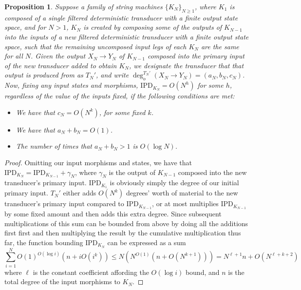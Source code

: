 \documentclass{article}
\newtheorem{proposition}[theorem]{Proposition}
\theoremstyle{definition}
\theoremstyle{remark}
\begin{document}
\begin{proposition}
    \label{prop:linearruntimeintransducers}
    Suppose a family of string machines $\{K_N\}_{N \geq 1}$, where
    $K_1$ is composed of a single filtered
    deterministic transducer with a finite
    output state space, and for $N>1$,
    $K_N$ is created by composing some of the outputs of $K_{N-1}$
    into the inputs of a new filtered deterministic transducer
    with a finite output state space,
    such that the
    remaining uncomposed input legs of each $K_N$ are the same for
    all $N$. Given the output
    $X_N\to Y_N$ of $K_{N-1}$ composed into the primary
    input of the new transducer added to obtain $K_N$, we designate
    the transducer that that output is produced from as $T_N'$, and
    write $\deg_o^{T_N'}(X_N\to Y_N) = (a_N,b_N,c_N)$.
    Now, fixing any input states and morphisms,
    $\mathrm{IPD}_{K_N} = O(N^h)$ for some $h$, regardless
    of the value of the inputs fixed, if the following
    conditions are met:
    \begin{itemize}
    \item We have that $c_N = O(N^{k})$, for some fixed $k$.
    \item We have that $a_N+b_N = O(1)$.
    \item The number of times that
    $a_N+b_N > 1$ is $O(\log N)$.
    \end{itemize}
\end{proposition}

\begin{proof}
Omitting
our input morphisms and states,
we have that $\mathrm{IPD}_{K_N} = \mathrm{IPD}_{K_{N-1}}+\gamma_N$, where
$\gamma_N$ is the output of $K_{N-1}$ composed into the new transducer's
primary input. $\mathrm{IPD}_{K_1}$
is obviously simply the degree of our initial
primary input.
$T_N'$ either adds $O(N^k)$ degrees' worth
of material to the new transducer's
primary input compared to $\mathrm{IPD}_{K_{N-1}}$, or at most
multiplies $\mathrm{IPD}_{K_{N-1}}$ by some fixed amount
and then adds this extra degree. Since subsequent multiplications
of this sum can be bounded from above by doing all the additions first
first and then multiplying the result by the cumulative
multiplication thus far, the function
bounding $\mathrm{IPD}_{K_N}$ can be expressed as a sum
$$\sum_{i=1}^N O(1)^{O(\log i)}(n+iO(i^{k})) \leq N(N^{O(1)}(n+O(N^{k+1})))
=N^{\ell+1}n+O(N^{\ell+k+2})
$$
where $\ell$ is the constant coefficient affording the $O(\log i)$ bound,
and $n$ is the total degree of the input morphisms to $K_N$.
\end{proof}
\end{document}
